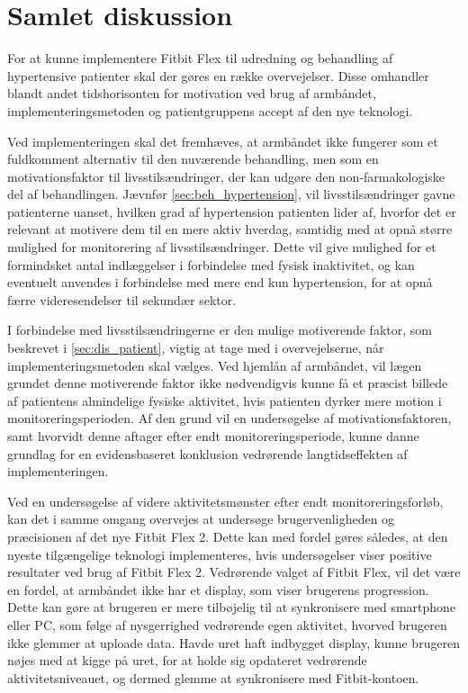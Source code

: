 \section{Samlet diskussion}

For at kunne implementere Fitbit Flex til udredning og behandling af hypertensive patienter skal der gøres en række overvejelser. Disse omhandler blandt andet tidshorisonten for motivation ved brug af armbåndet, implementeringsmetoden og patientgruppens accept af den nye teknologi. 

Ved implementeringen skal det fremhæves, at armbåndet ikke fungerer som et fuldkomment alternativ til den nuværende behandling, men som en motivationsfaktor til livsstilsændringer, der kan udgøre den non-farmakologiske del af behandlingen. Jævnfør \autoref{sec:beh_hypertension}, vil livsstilsændringer gavne patienterne uanset, hvilken grad af hypertension patienten lider af, hvorfor det er relevant at motivere dem til en mere aktiv hverdag, samtidig med at opnå større mulighed for monitorering af livsstilsændringer. Dette vil give mulighed for et formindsket antal indlæggelser i forbindelse med fysisk inaktivitet, og kan eventuelt anvendes i forbindelse med mere end kun hypertension, for at opnå færre videresendelser til sekundær sektor.

I forbindelse med livsstilsændringerne er den mulige motiverende faktor, som beskrevet i \autoref{sec:dis_patient}, vigtig at tage med i overvejelserne, når implementeringsmetoden skal vælges. Ved hjemlån af armbåndet, vil lægen grundet denne motiverende faktor ikke nødvendigvis kunne få et præcist billede af patientens almindelige fysiske aktivitet, hvis patienten dyrker mere motion i monitoreringsperioden. Af den grund vil en undersøgelse af motivationsfaktoren, samt hvorvidt denne aftager efter endt monitoreringsperiode, kunne danne grundlag for en evidensbaseret konklusion vedrørende langtidseffekten af implementeringen.

Ved en undersøgelse af videre aktivitetsmønster efter endt monitoreringsforløb, kan det i samme omgang overvejes at undersøge brugervenligheden og præcisionen af det nye Fitbit Flex 2. Dette kan med fordel gøres således, at den nyeste tilgængelige teknologi implementeres, hvis undersøgelser viser positive resultater ved brug af Fitbit Flex 2. Vedrørende valget af Fitbit Flex, vil det være en fordel, at armbåndet ikke har et display, som viser brugerens progression. Dette kan gøre at brugeren er mere tilbøjelig til at synkronisere med smartphone eller PC, som følge af nysgerrighed vedrørende egen aktivitet, hvorved brugeren ikke glemmer at uploade data. Havde uret haft indbygget display, kunne brugeren nøjes med at kigge på uret, for at holde sig opdateret vedrørende aktivitetsniveauet, og dermed glemme at synkronisere med Fitbit-kontoen.

